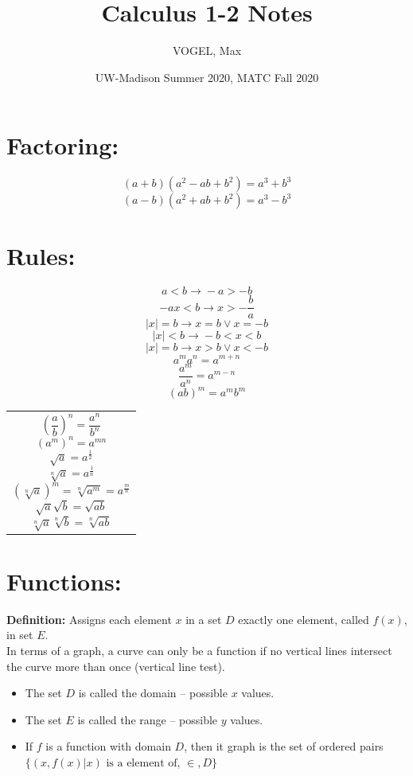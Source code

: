 \documentclass[12pt]{article}
\begin{document}
 
\title{Calculus 1-2 Notes}
\author{VOGEL, Max}
\date{UW-Madison Summer 2020, MATC Fall 2020}

\setcounter{tocdepth}{4}
\setcounter{secnumdepth}{4}

\maketitle
\tableofcontents
\newpage

\section{Factoring:}
$$(a+b)(a^2-ab+b^2)=a^3+b^3 $$
$$(a-b)(a^2+ab+b^2)=a^3-b^3 $$


\section{Rules:}
\begin{minipage}{0.45\textwidth}
$$ a < b \rightarrow{} -a > -b $$
$$ -ax < b \rightarrow{} x > -\frac{b}{a} $$
$$ |x| = b \rightarrow{} x = b \vee x = -b $$
$$ |x| < b \rightarrow{} -b < x < b $$
$$ |x| = b \rightarrow{} x > b \vee x < -b $$
$$ a^m a^n = a^{m+n} $$
$$ \frac{a^m}{a^n} = a^{m-n}$$
$$ (ab)^m=a^m b^m$$
\hfill
\end{minipage}
\begin{minipage}{0.45\textwidth}
\begin{tabular}{|p{\textwidth}}
$$ \left(\frac{a}{b}\right)^n = \frac{a^n}{b^n}$$
$$ (a^m)^n = a^{mn}$$
$$ \sqrt{a} = a^{\frac{1}{2}}$$
$$ \sqrt[n]{a} = a^{\frac{1}{n}}$$
$$ \left(\sqrt[n]{a}\right)^m = \sqrt[n]{a^m} = a^{\frac{m}{n}}$$
$$ \sqrt{a}\sqrt{b} = \sqrt{ab}$$
$$ \sqrt[n]{a} \sqrt[n]{b} = \sqrt[n]{ab}$$\\
\end{tabular}
\end{minipage}

\section{Functions:}

\textbf{Definition: }
Assigns each element $x$ in a set $D$ exactly one element, called $f(x)$, in set $E$.\\
In terms of a graph, a curve can only be a function if no vertical lines intersect the curve more than once (vertical line test).
\begin{itemize}
    \item The set $D$ is called the domain -- possible $x$ values.
    \item The set $E$ is called the range -- possible $y$ values.
    \item If $f$ is a function with domain $D$, then it graph is the set of ordered pairs\\
    $ \{(x, f(x) | x) \text{ is a element of, } \in{}, D\}$
\end{itemize}
\end{document}
